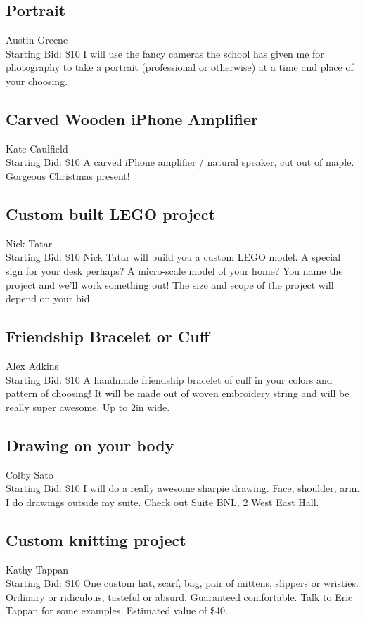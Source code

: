 \documentclass[11pt]{article}
\begin{document}
\subsection{Portrait}
Austin Greene
\\
Starting Bid: \$10
\newline
I will use the fancy cameras the school has given me for photography to take a portrait (professional or otherwise) at a time and place of your choosing.
\subsection{Carved Wooden iPhone Amplifier}
Kate Caulfield
\\
Starting Bid: \$10
\newline
A carved iPhone amplifier / natural speaker, cut out of maple. Gorgeous Christmas present!
\subsection{Custom built LEGO project}
Nick Tatar
\\
Starting Bid: \$10
\newline
Nick Tatar will build you a custom LEGO model. A special sign for your desk perhaps? A micro-scale model of your home? You name the project and we'll work something out! The size and scope of the project will depend on your bid.
\subsection{Friendship Bracelet or Cuff}
Alex Adkins
\\
Starting Bid: \$10
\newline
A handmade friendship bracelet of cuff in your colors and pattern of choosing! It will be made out of woven embroidery string and will be really super awesome. Up to 2in wide.
\subsection{Drawing on your body}
Colby Sato
\\
Starting Bid: \$10
\newline
I will do a really awesome sharpie drawing. Face, shoulder, arm. 
I do drawings outside my suite. 
Check out Suite BNL, 2 West East Hall.
\subsection{Custom knitting project}
Kathy Tappan
\\
Starting Bid: \$10
\newline
One custom hat, scarf, bag, pair of mittens, slippers or wristies. Ordinary or ridiculous, tasteful or absurd. Guaranteed comfortable. Talk to Eric Tappan for some examples.
Estimated value of \$40.
\end{document}
